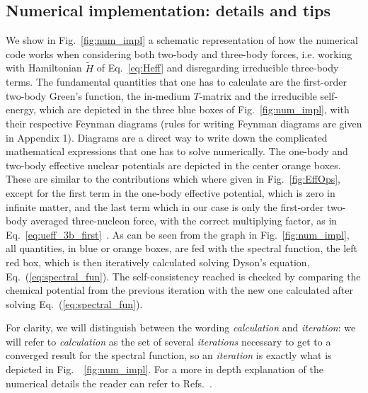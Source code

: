 \subsection{Numerical implementation: details and tips}
We show in Fig.~\ref{fig:num_impl} a schematic representation of how the numerical code works when considering both two-body and three-body forces, i.e. working with Hamiltonian $\tilde H$ of Eq.~\eqref{eq:Heff} and disregarding irreducible three-body terms. %
The fundamental quantities that one has to calculate are the first-order two-body Green's function, the in-medium $T$-matrix and the irreducible self-energy, which are depicted in the three blue boxes of Fig.~\ref{fig:num_impl}, with their respective Feynman diagrams (rules for writing Feynman diagrams are given in Appendix 1). Diagrams are a direct way to write down the complicated mathematical expressions that one has to solve numerically. The one-body and two-body effective nuclear potentials are depicted in the center orange boxes. These are similar to the contributions which where given in Fig.~\ref{fig:EffOps}, except for the first term in the one-body effective potential, which is zero in infinite matter, and the last term which in our case is only the first-order two-body averaged three-nucleon force, with the correct multiplying factor, as in Eq.~\eqref{eq:ueff_3b_first}~\cite{ch11_Carbone2013NM3nf,ch11_Carbone2014}. As can be seen from the graph in Fig.~\ref{fig:num_impl}, all quantities, in blue or orange boxes, are fed with the spectral function, the left red box, which is then iteratively calculated solving Dyson's equation, Eq.~(\ref{eq:spectral_fun}). The self-consistency reached is checked by comparing the chemical potential from the previous iteration with the new one calculated after solving Eq.~(\ref{eq:spectral_fun}).

For clarity, we will distinguish between the wording \emph{calculation} and \emph{iteration}: we will refer to \emph{calculation} as the set of several \emph{iterations} necessary to get to a converged result for the spectral function, so an \emph{iteration} is exactly what is depicted in Fig.~~\ref{fig:num_impl}. For a more in depth explanation of the numerical details the reader can refer to Refs.~\cite{ch11_Frick2004PhD,ch11_Rios2007PhD}.\\


